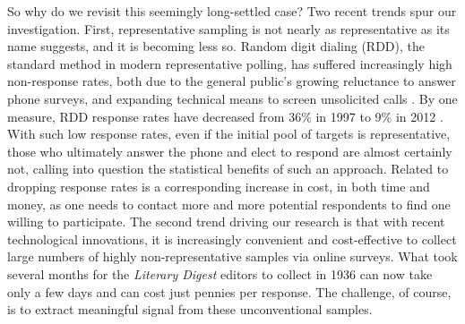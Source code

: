 \documentclass[preprint,authoryear,12pt]{elsarticle}
\begin{document}
So why do we revisit this seemingly long-settled case? Two recent trends
spur our investigation.
First, representative sampling is not nearly as representative as its name
suggests, and it is becoming less so. Random digit dialing (RDD), the standard
method in modern representative polling, has suffered increasingly high
non-response rates, both
due to the general public's growing reluctance to answer phone surveys,
and expanding technical means to screen unsolicited calls
\citep{keeter2006gauging}. By one measure, RDD response rates have decreased from 36\% in 1997 to 9\% in 2012
\citep{kohut2012assessing}. With such low response rates, even if the initial pool of targets is representative,
those who ultimately answer the phone and elect to respond are almost certainly not, calling into question the statistical benefits of such an approach.
Related to dropping response rates is a corresponding increase in cost, in both time and money, as one needs to contact more and more potential respondents to find one willing to participate.
The second trend driving our research is that with recent technological innovations, it is increasingly convenient and cost-effective to collect large numbers of highly non-representative samples via online surveys.
What took several months for the
\textsl{Literary Digest} editors to collect in 1936 can now take only a
few days and can cost just pennies per response.
The challenge, of course, is to extract meaningful signal from these unconventional samples.
\end{document}
